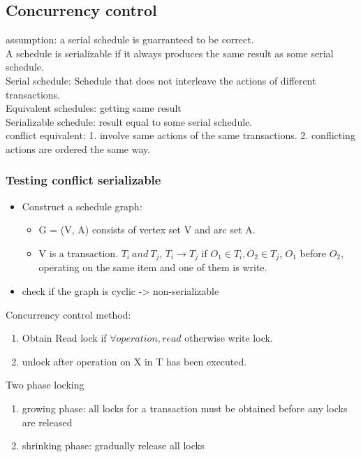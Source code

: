 \documentclass[a4paper]{scrartcl}
\begin{document}
  \subsection{Concurrency control}
    assumption: a serial schedule is guarranteed to be correct.
    \\ A schedule is serializable if it always produces the same result as some serial schedule.
    \\ Serial schedule: Schedule that does not interleave the actions of different transactions.
    \\ Equivalent schedules: getting same result
    \\ Serializable schedule: result equal to some serial schedule.
    \\ conflict equivalent: 1. involve same actions of the same transactions. 2. conflicting actions are ordered the same way.
    \subsubsection{Testing conflict serializable}
    \begin{itemize}
      \item Construct a schedule graph:
        \begin{itemize}
          \item G = (V, A) consists of vertex set V and arc set A.
          \item V is a transaction. $T_i~and~T_j$, $T_i\rightarrow T_j$ if $O_1 \in T_i, O_2 \in T_j$, $O_1$ before $O_2$, operating on the same item and one of them is write.
        \end{itemize}
      \item check if the graph is cyclic -> non-serializable
    \end{itemize}
    Concurrency control method:
    \begin{enumerate}
      \item Obtain Read lock if $\forall operation, read$ otherwise write lock.
      \item unlock after operation on X in T has been executed.
    \end{enumerate}
    Two phase locking
    \begin{enumerate}
      \item growing phase: all locks for a transaction must be obtained before any locks are released
      \item shrinking phase: gradually release all locks
    \end{enumerate}
\end{document}
